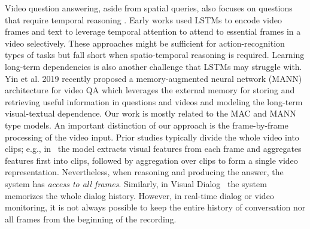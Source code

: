 Video question answering, aside from spatial queries, also focuses on questions that require temporal reasoning .  Early works \citep{mun2017marioqa, xu2017video, yu2017end} used LSTMs to encode video frames and text to leverage temporal attention to attend to essential frames in a video selectively.   These approaches might be sufficient for action-recognition types of tasks but fall short when spatio-temporal reasoning is required.  Learning long-term dependencies is also another challenge that LSTMs may struggle with.  Yin et al. 2019 \citep{yin2019memory} recently proposed a memory-augmented neural network (MANN) architecture for video QA which leverages the external memory for storing and retrieving useful information in questions and videos and modeling the long-term visual-textual dependence.
Our work is mostly related to the MAC and MANN type models. An important distinction of our approach is the frame-by-frame processing of the video input.  Prior studies typically divide the whole video into clips; e.g., in~\cite{song2018explore} the model extracts visual features from each frame and aggregates features first into clips, followed by aggregation over clips to form a single video representation.
Nevertheless, when reasoning and producing the answer, the system has \textit{access to all frames}.  Similarly, in Visual Dialog~\cite{das2017visual} the system memorizes the whole dialog history. However, in real-time dialog or video monitoring, it is not always possible to keep the entire history of conversation nor all frames from the beginning of the recording. 